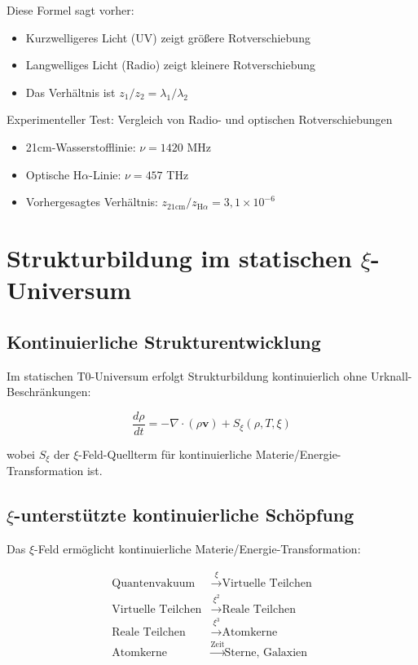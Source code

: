 \documentclass[12pt,a4paper]{article}
\begin{document}
	Diese Formel sagt vorher:
	\begin{itemize}
		\item Kurzwelligeres Licht (UV) zeigt größere Rotverschiebung
		\item Langwelliges Licht (Radio) zeigt kleinere Rotverschiebung
		\item Das Verhältnis ist $z_1/z_2 = \lambda_1/\lambda_2$
	\end{itemize}
	
	\begin{experiment}
		Experimenteller Test: Vergleich von Radio- und optischen Rotverschiebungen
		\begin{itemize}
			\item 21cm-Wasserstofflinie: $\nu = 1420$ MHz
			\item Optische H$\alpha$-Linie: $\nu = 457$ THz
			\item Vorhergesagtes Verhältnis: $z_{21\text{cm}}/z_{\text{H}\alpha} = 3{,}1 \times 10^{-6}$
		\end{itemize}
	\end{experiment}
	
	\section{Strukturbildung im statischen $\xi$-Universum}
	
	\subsection{Kontinuierliche Strukturentwicklung}
	
	Im statischen T0-Universum erfolgt Strukturbildung kontinuierlich ohne Urknall-Beschränkungen:
	
	\begin{equation}
		\frac{d\rho}{dt} = -\nabla \cdot (\rho \mathbf{v}) + S_\xi(\rho, T, \xi)
	\end{equation}
	
	wobei $S_\xi$ der $\xi$-Feld-Quellterm für kontinuierliche Materie/Energie-Transformation ist.
	
	\subsection{$\xi$-unterstützte kontinuierliche Schöpfung}
	
	Das $\xi$-Feld ermöglicht kontinuierliche Materie/Energie-Transformation:
	
	\begin{align}
		\text{Quantenvakuum} &\xrightarrow{\xi} \text{Virtuelle Teilchen} \\
		\text{Virtuelle Teilchen} &\xrightarrow{\xi^2} \text{Reale Teilchen} \\
		\text{Reale Teilchen} &\xrightarrow{\xi^3} \text{Atomkerne} \\
		\text{Atomkerne} &\xrightarrow{\text{Zeit}} \text{Sterne, Galaxien}
	\end{align}
	
\end{document}
